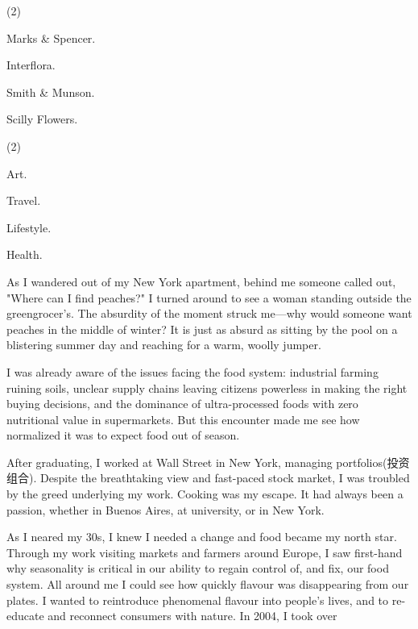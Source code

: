 \documentclass{英语试卷}
\begin{document}
\begin{choices}(2)
  \item Marks \& Spencer.
  \item Interflora.
  \item Smith \& Munson.
  \item Scilly Flowers.
\end{choices}
\begin{choices}(2)
  \item Art.
  \item Travel.
  \item Lifestyle.
  \item Health.
\end{choices}
\par As I wandered out of my New York apartment, behind me someone called out, "Where can I find peaches?" I turned around to see a woman standing outside the greengrocer's. The absurdity of the moment struck me—why would someone want peaches in the middle of winter? It is just as absurd as sitting by the pool on a blistering summer day and reaching for a warm, woolly jumper.\par
\par I was already aware of the issues facing the food system: industrial farming ruining soils, unclear supply chains leaving citizens powerless in making the right buying decisions, and the dominance of ultra-processed foods with zero nutritional value in supermarkets. But this encounter made me see how normalized it was to expect food out of season.\par
\par After graduating, I worked at Wall Street in New York, managing portfolios(投资组合). Despite the breathtaking view and fast-paced stock market, I was troubled by the greed underlying my work. Cooking was my escape. It had always been a passion, whether in Buenos Aires, at university, or in New York.\par
\par As I neared my 30s, I knew I needed a change and food became my north star. Through my work visiting markets and farmers around Europe, I saw first-hand why seasonality is critical in our ability to regain control of, and fix, our food system. All around me I could see how quickly flavour was disappearing from our plates. I wanted to reintroduce phenomenal flavour into people's lives, and to re-educate and reconnect consumers with nature. In 2004, I took over\par
\end{document}
